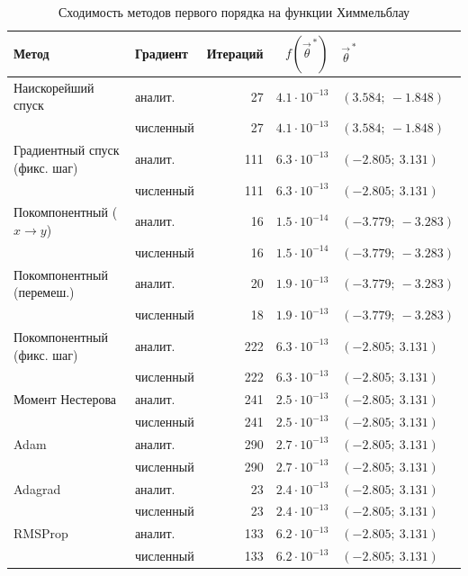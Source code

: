 \documentclass[a4paper]{article}
\begin{document}
\begin{table}[H]
    \centering
    \small
    \caption{Сходимость методов первого порядка на функции Химмельблау}
    \label{tab:block1h}
    \begin{tabular}{llrrl}
        \toprule
        Метод & Градиент & Итераций & $f(\vec{\theta}^{\,*})$ & $\vec{\theta}^{\,*}$ \\
        \midrule
        Наискорейший спуск & аналит. & 27 & $4.1\cdot10^{-13}$ & $(3.584;\ -1.848)$ \\
                           & численный & 27 & $4.1\cdot10^{-13}$ & $(3.584;\ -1.848)$ \\
        Градиентный спуск (фикс. шаг) & аналит. & 111 & $6.3\cdot10^{-13}$ & $(-2.805;\ 3.131)$ \\
                           & численный & 111 & $6.3\cdot10^{-13}$ & $(-2.805;\ 3.131)$ \\
        Покомпонентный ($x \to y$) & аналит. & 16 & $1.5\cdot10^{-14}$ & $(-3.779;\ -3.283)$ \\
                           & численный & 16 & $1.5\cdot10^{-14}$ & $(-3.779;\ -3.283)$ \\
        Покомпонентный (перемеш.) & аналит. & 20 & $1.9\cdot10^{-13}$ & $(-3.779;\ -3.283)$ \\
                           & численный & 18 & $1.9\cdot10^{-13}$ & $(-3.779;\ -3.283)$ \\
        Покомпонентный (фикс. шаг) & аналит. & 222 & $6.3\cdot10^{-13}$ & $(-2.805;\ 3.131)$ \\
                           & численный & 222 & $6.3\cdot10^{-13}$ & $(-2.805;\ 3.131)$ \\
        Момент Нестерова & аналит. & 241 & $2.5\cdot10^{-13}$ & $(-2.805;\ 3.131)$ \\
                           & численный & 241 & $2.5\cdot10^{-13}$ & $(-2.805;\ 3.131)$ \\
        Adam & аналит. & 290 & $2.7\cdot10^{-13}$ & $(-2.805;\ 3.131)$ \\
                           & численный & 290 & $2.7\cdot10^{-13}$ & $(-2.805;\ 3.131)$ \\
        Adagrad & аналит. & 23 & $2.4\cdot10^{-13}$ & $(-2.805;\ 3.131)$ \\
                           & численный & 23 & $2.4\cdot10^{-13}$ & $(-2.805;\ 3.131)$ \\
        RMSProp & аналит. & 133 & $6.2\cdot10^{-13}$ & $(-2.805;\ 3.131)$ \\
                           & численный & 133 & $6.2\cdot10^{-13}$ & $(-2.805;\ 3.131)$ \\
        \bottomrule
    \end{tabular}
\end{table}
\end{document}

